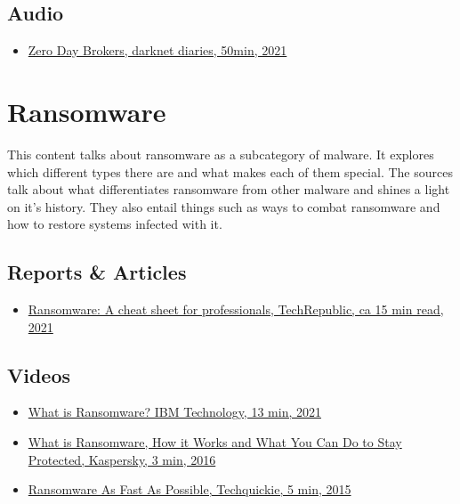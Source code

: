 \section{Audio}

\begin{itemize}
    \item \href{https://darknetdiaries.com/episode/98/}{Zero Day Brokers, darknet diaries, 50min, 2021}
\end{itemize}

\chapter{Ransomware}

This content talks about ransomware as a subcategory of malware.
It explores which different types there are and what makes each of them special.
The sources talk about what differentiates ransomware from other malware and shines a light on it's history.
They also entail things such as ways to combat ransomware and how to restore systems infected with it.

\section{Reports \& Articles}

\begin{itemize}
    \item \href{https://www.techrepublic.com/article/ransomware-cheat-sheet-everything-you-need-to-know/}{Ransomware: A cheat sheet for professionals, TechRepublic, ca 15 min read, 2021}
\end{itemize}


\section{Videos}

\begin{itemize}
    \item \href{https://www.youtube.com/watch?v=imNfrtvYYbw}{What is Ransomware? IBM Technology, 13 min, 2021}
    \item \href{https://www.youtube.com/watch?v=Vkjekr6jacg}{What is Ransomware, How it Works and What You Can Do to Stay Protected, Kaspersky, 3 min, 2016}
    \item \href{https://www.youtube.com/watch?v=shDgBHUXnr8}{Ransomware As Fast As Possible, Techquickie, 5 min, 2015}
\end{itemize}

